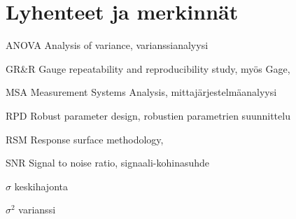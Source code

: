 \documentclass[12pt,a4paper,finnish]{tutthesis}
\begin{document}


%
%

\chapter*{Lyhenteet ja merkinnät}
\markboth{}{}                                %

\begin{termlist}
\item [ANOVA]      Analysis of variance, varianssianalyysi
\item [GR\&R] 	   Gauge repeatability and reproducibility study, myös Gage,
\item [MSA]        Measurement Systems Analysis, mittajärjestelmäanalyysi
\item [RPD]        Robust parameter design, robustien parametrien suunnittelu
\item [RSM]        Response surface methodology,
\item [SNR]        Signal to noise ratio, signaali-kohinasuhde
\end{termlist} 

\begin{termlist}
\item [$\sigma$] keskihajonta
\item [$\sigma^2$] varianssi
\end{termlist} 

\end{document}
